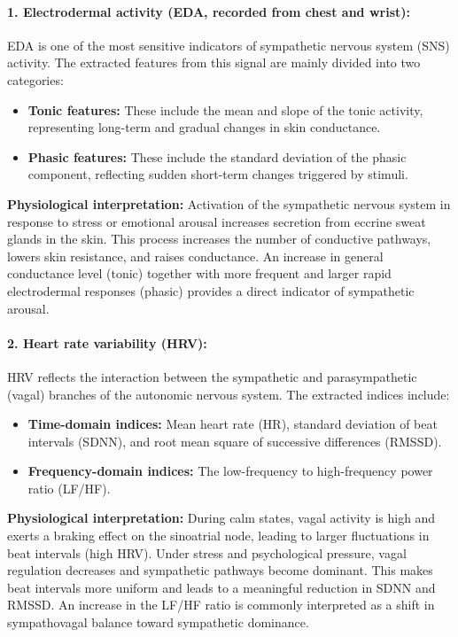 \documentclass[12pt,a4paper]{article}
\begin{document}
	\paragraph{1. Electrodermal activity (EDA, recorded from chest and wrist):}
	EDA is one of the most sensitive indicators of sympathetic nervous system (SNS) activity. The extracted features from this signal are mainly divided into two categories:
	\begin{itemize}
		\item \textbf{Tonic features:} These include the mean and slope of the tonic activity, representing long-term and gradual changes in skin conductance.
		\item \textbf{Phasic features:} These include the standard deviation of the phasic component, reflecting sudden short-term changes triggered by stimuli.
	\end{itemize}
	\textbf{Physiological interpretation:} Activation of the sympathetic nervous system in response to stress or emotional arousal increases secretion from eccrine sweat glands in the skin. This process increases the number of conductive pathways, lowers skin resistance, and raises conductance. An increase in general conductance level (tonic) together with more frequent and larger rapid electrodermal responses (phasic) provides a direct indicator of sympathetic arousal.
	
	\paragraph{2. Heart rate variability (HRV):}
	HRV reflects the interaction between the sympathetic and parasympathetic (vagal) branches of the autonomic nervous system. The extracted indices include:
	\begin{itemize}
		\item \textbf{Time-domain indices:} Mean heart rate (HR), standard deviation of beat intervals (SDNN), and root mean square of successive differences (RMSSD).
		\item \textbf{Frequency-domain indices:} The low-frequency to high-frequency power ratio (LF/HF).
	\end{itemize}
	\textbf{Physiological interpretation:} During calm states, vagal activity is high and exerts a braking effect on the sinoatrial node, leading to larger fluctuations in beat intervals (high HRV). Under stress and psychological pressure, vagal regulation decreases and sympathetic pathways become dominant. This makes beat intervals more uniform and leads to a meaningful reduction in SDNN and RMSSD. An increase in the LF/HF ratio is commonly interpreted as a shift in sympathovagal balance toward sympathetic dominance.
	
\end{document}
